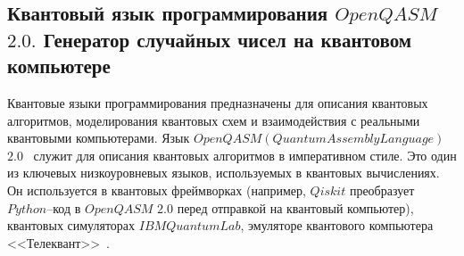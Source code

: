 \documentclass[12pt,a4paper]{article}
\begin{document}
	\subsection{Квантовый язык программирования $OpenQASM$ $2.0.$ Генератор случайных чисел на квантовом компьютере}
	Квантовые языки программирования предназначены для описания квантовых алгоритмов, моделирования квантовых схем и взаимодействия с реальными квантовыми компьютерами. Язык $OpenQASM (Quantum Assembly Language)$ $2.0$~\cite{openqasm} служит для описания квантовых алгоритмов в императивном стиле. Это один из ключевых низкоуровневых  языков, используемых в квантовых вычислениях. Он используется в квантовых фреймворках (например, $Qiskit$ преобразует $Python$--код в $OpenQASM$ $2.0$ перед отправкой на квантовый компьютер), квантовых симуляторах $IBM Quantum Lab$, эмуляторе квантового компьютера <<Телеквант>>~\cite{Telequant}.
	
\end{document}

